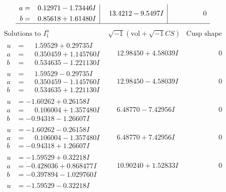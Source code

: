 \documentclass[1p]{elsarticle_modified}
\theoremstyle{definition}
\newcommand{\I}{\sqrt{-1}}
\begin{document}
$$\begin{array}{c|c|c}
\begin{aligned}
a &= \phantom{-}0.12971 - 1.73446 I \\
b &= \phantom{-}0.85618 + 1.61480 I\end{aligned}
 & \phantom{-}13.4212 - 9.5497 I & \phantom{-0.000000 } 0\\
 \hline 
 \end{array}$$\newpage$$\begin{array}{c|c|c}  
\text{Solutions to }I^u_{1}& \I (\text{vol} + \sqrt{-1}CS) & \text{Cusp shape}\\
 \hline 
\begin{aligned}
u &= \phantom{-}1.59529 + 0.29735 I \\
a &= \phantom{-}0.350459 + 1.145760 I \\
b &= \phantom{-}0.534635 - 1.221130 I\end{aligned}
 & \phantom{-}12.98450 + 4.58039 I & \phantom{-0.000000 } 0 \\ \hline\begin{aligned}
u &= \phantom{-}1.59529 - 0.29735 I \\
a &= \phantom{-}0.350459 - 1.145760 I \\
b &= \phantom{-}0.534635 + 1.221130 I\end{aligned}
 & \phantom{-}12.98450 - 4.58039 I & \phantom{-0.000000 } 0 \\ \hline\begin{aligned}
u &= -1.60262 + 0.26158 I \\
a &= \phantom{-}0.106004 + 1.357480 I \\
b &= -0.94318 - 1.26607 I\end{aligned}
 & \phantom{-}6.48770 - 7.42956 I & \phantom{-0.000000 } 0 \\ \hline\begin{aligned}
u &= -1.60262 - 0.26158 I \\
a &= \phantom{-}0.106004 - 1.357480 I \\
b &= -0.94318 + 1.26607 I\end{aligned}
 & \phantom{-}6.48770 + 7.42956 I & \phantom{-0.000000 } 0 \\ \hline\begin{aligned}
u &= -1.59529 + 0.32218 I \\
a &= -0.428036 + 0.868477 I \\
b &= -0.397894 - 1.029760 I\end{aligned}
 & \phantom{-}10.90240 + 1.52833 I & \phantom{-0.000000 } 0 \\ \hline\begin{aligned}
u &= -1.59529 - 0.32218 I \\

\end{aligned}
\end{array}$$
\end{document}
